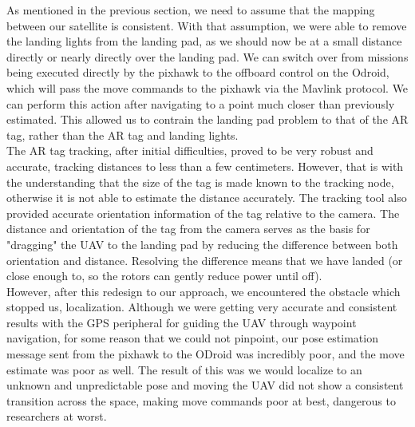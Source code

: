 As mentioned in the previous section, we need to assume that the mapping between our satellite is consistent. With that assumption, we were able to remove the landing lights from the landing pad, as we should now be at a small distance directly or nearly directly over the landing pad. We can switch over from missions being executed directly by the pixhawk to the offboard control on the Odroid, which will pass the move commands to the pixhawk via the Mavlink protocol. We can perform this action after navigating to a point much closer than previously estimated. This allowed us to contrain the landing pad problem to that of the AR tag, rather than the AR tag and landing lights.\\

The AR tag tracking, after initial difficulties, proved to be very robust and accurate, tracking distances to less than a few centimeters. However, that is with the understanding that the size of the tag is made known to the tracking node, otherwise it is not able to estimate the distance accurately. The tracking tool also provided accurate orientation information of the tag relative to the camera. The distance and orientation of the tag from the camera serves as the basis for "dragging" the UAV to the landing pad by reducing the difference between both orientation and distance. Resolving the difference means that we have landed (or close enough to, so the rotors can gently reduce power until off). \\

However, after this redesign to our approach, we encountered the obstacle which stopped us, localization. Although we were getting very accurate and consistent results with the GPS peripheral for guiding the UAV through waypoint navigation, for some reason that we could not pinpoint, our pose estimation message sent from the pixhawk to the ODroid was incredibly poor, and the move estimate was poor as well. The result of this was we would localize to an unknown and unpredictable pose and moving the UAV did not show a consistent transition across the space, making move commands poor at best, dangerous to researchers at worst.\\



